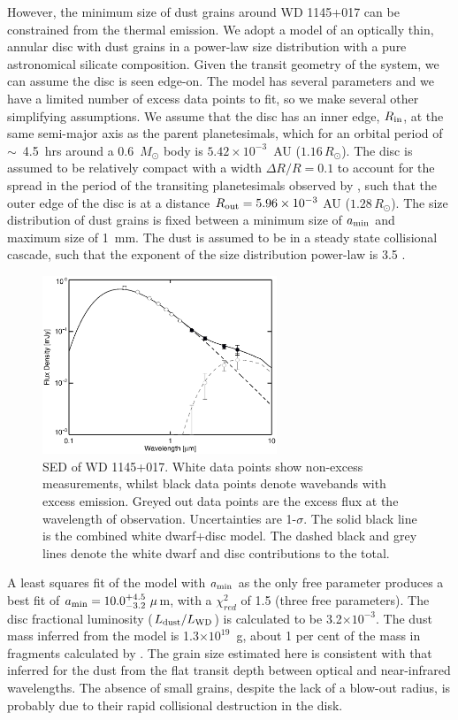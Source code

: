 \documentclass[apj]{emulateapj}
\begin{document}
However, the minimum size of dust grains around WD 1145+017 can be constrained from the thermal emission. We adopt a model of an optically thin, annular disc with dust grains in a power-law size distribution with a pure astronomical silicate composition. Given the transit geometry of the system, we can assume the disc is seen edge-on.  The model has several parameters and we have a limited number of excess data points to fit, so we make several other simplifying assumptions. We assume that the disc has an inner edge, $R_{\rm in}$, at the same semi-major axis as the parent planetesimals, which for an orbital period of $\sim$~4.5~hrs around a 0.6~$M_{\odot}$ body is $5.42\times10^{-3}$~AU ($1.16\,R_\odot$). The disc is assumed to be relatively compact with a width $\Delta R/R = 0.1$ to account for the spread in the period of the transiting planetesimals observed by \citet{2015Natur.526..546V}, such that the outer edge of the disc is at a distance $R_{\rm out} = 5.96\times10^{-3}~$AU ($1.28\,R_\odot$).  The size distribution of dust grains is fixed between a minimum size of $a_{\rm min}$ and maximum size of 1~mm. The dust is assumed to be in a steady state collisional cascade, such that the exponent of the size distribution power-law is 3.5 \citep{1969JGR....74.2531D}. 

\begin{figure}
    \centering
    \includegraphics[width=7cm]{plots/wd1145p017_sed_astrosil.eps}
    \caption{SED of WD 1145+017. White data points show non-excess measurements, whilst black data points denote wavebands with excess emission. Greyed out data points are the excess flux at the wavelength of observation. Uncertainties are 1-$\sigma$. The solid black line is the combined white dwarf+disc model. The dashed black and grey lines denote the white dwarf and disc contributions to the total. \label{fig:wd1145p017_sed}}
\end{figure}

A least squares fit of the model with $a_{\rm min}$ as the only free parameter produces a best fit of $a_{\rm min} = 10.0^{+4.5}_{-3.2}~\mu$m, with a $\chi^{2}_{red}$ of 1.5 (three free parameters). The disc fractional luminosity ($L_{\rm dust}/L_{\rm WD}$) is calculated to be 3.2$\times10^{-3}$. The dust mass inferred from the model is 1.3$\times10^{19}$~g, about 1 per cent of the mass in fragments calculated by \cite{2015Natur.526..546V}. The grain size estimated here is consistent with that inferred for the dust from the flat transit depth between optical and near-infrared wavelengths. The absence of small grains, despite the lack of a blow-out radius, is probably due to their rapid collisional destruction in the disk.
\end{document}
